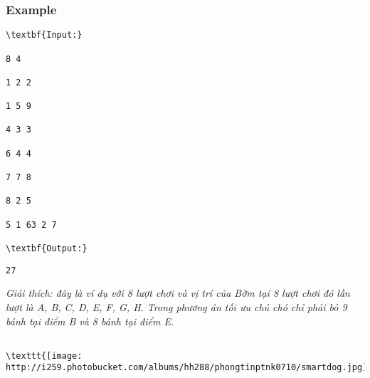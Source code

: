 \subsubsection{   Example  }
\begin{verbatim}
\textbf{Input:}

8 4

1 2 2

1 5 9

4 3 3

6 4 4

7 7 8

8 2 5

5 1 63 2 7

\textbf{Output:}\end{verbatim}
\begin{verbatim}
27\end{verbatim}

\emph{    Giải thích: đây là ví dụ với 8 lượt chơi và vị trí của Bờm tại 8 lượt chơi đó lần lượt là A, B, C, D, E, F, G, H. Trong phương án tối ưu chú chó chỉ phải bỏ 9 bánh tại điểm B và 8 bánh tại điểm E.   }
\begin{verbatim}

\texttt{[image: http://i259.photobucket.com/albums/hh288/phongtinptnk0710/smartdog.jpg]}\end{verbatim}